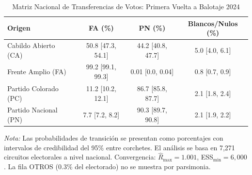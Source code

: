\begin{table}[H]
\centering
\caption{Matriz Nacional de Transferencias de Votos: Primera Vuelta a Balotaje 2024}
\label{tab:national_transitions}
\begin{tabular}{lccc}
\toprule
\textbf{Origen} & \textbf{FA (\%)} & \textbf{PN (\%)} & \textbf{Blancos/Nulos (\%)} \\
\midrule
Cabildo Abierto (CA) & 50.8 [47.3, 54.1] & 44.2 [40.8, 47.7] & 5.0 [4.0, 6.1] \\
Frente Amplio (FA) & 99.2 [99.1, 99.3] & 0.01 [0.0, 0.04] & 0.8 [0.7, 0.9] \\
Partido Colorado (PC) & 11.2 [10.2, 12.1] & 86.7 [85.8, 87.7] & 2.1 [1.8, 2.4] \\
Partido Nacional (PN) & 7.7 [7.2, 8.2] & 90.3 [89.7, 90.8] & 2.1 [1.9, 2.2] \\
\bottomrule
\end{tabular}
\vspace{0.3cm}

\footnotesize
\textit{Nota:} Las probabilidades de transición se presentan como porcentajes con intervalos de credibilidad del 95\% entre corchetes. El análisis se basa en 7,271 circuitos electorales a nivel nacional. Convergencia: $\hat{R}_{\text{max}} = 1.001$, ESS$_{\text{min}} = 6,000$. La fila OTROS (0.3\% del electorado) no se muestra por parsimonia.
\end{table}
